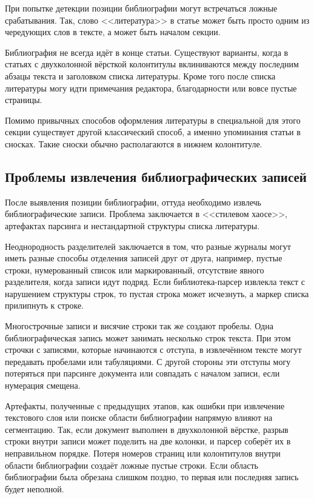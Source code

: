 При попытке детекции позиции библиографии могут встречаться ложные срабатывания. Так, слово <<литература>> в статье может быть просто одним из чередующих слов в тексте, а может быть началом секции\cite{romary2015grobid}. 

Библиография не всегда идёт в конце статьи. Существуют варианты, когда в статьях с двухколонной вёрсткой колонтитулы вклиниваются между последним абзацы текста и заголовком списка литературы. Кроме того после списка литературы могу идти примечания редактора, благодарности или вовсе пустые страницы.

Помимо привычных способов оформления литературы в специальной для этого секции существует другой классический способ, а именно упоминания статьи в сносках. Такие сноски обычно располагаются в нижнем колонтитуле\cite{zhu2026benchmarking}.

\subsection{Проблемы извлечения библиографических записей}
После выявления позиции библиографии, оттуда необходимо извлечь библиографические записи. Проблема заключается в <<стилевом хаосе>>, артефактах парсинга и нестандартной структуры списка литературы\cite{ivanovic2016new}.

Неоднородность разделителей заключается в том, что разные журналы могут иметь разные способы отделения записей друг от друга, например, пустые строки, нумерованный список или маркированный, отсутствие явного разделителя, когда записи идут подряд. Если библиотека-парсер извлекла текст с нарушением структуры строк, то пустая строка может исчезнуть, а маркер списка прилипнуть к строке\cite{backes2024comparing}. 

Многострочные записи и висячие строки так же создают пробелы. Одна библиографическая запись может занимать несколько строк текста. При этом строчки с записями, которые начинаются с отступа, в извлечённом тексте могут передавать пробелами или табуляциями. С другой стороны эти отступы могу потеряться при парсинге документа или совпадать с началом записи, если нумерация смещена\cite{tkaczyk2015cermine}.

Артефакты, полученные с предыдущих этапов, как ошибки при извлечение текстового слоя или поиске области библиографии напрямую влияют на сегментацию. Так, если документ выполнен в двухколонной вёрстке, разрыв строки внутри записи может поделить на две колонки, и парсер соберёт их в неправильном порядке. Потеря номеров страниц или колонтитулов внутри области библиографии создаёт ложные пустые строки. Если область библиографии была обрезана слишком поздно, то первая или последняя запись будет неполной\cite{korner2017reference}.

